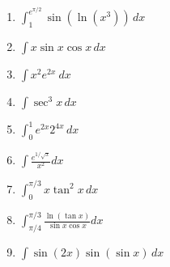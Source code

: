 \documentclass[letterpaper]{article}
\begin{document}
\begin{enumerate}
\begin{enumerate}
	\item $\int_1^{e^{\pi/2}} \sin (\ln (x^3))\,dx$

	\item $\int x \sin x \cos x\,dx$

	\item $\int x^2 e^{2x}~dx$

	\item $\int \sec^3 x\,dx$

	\item $\int_0^1 e^{2x}2^{4x}\,dx$

	\item $\int \frac{e^{1/\sqrt{x}}}{x^2}dx$

	\item $\int_0^{\pi/3} x\tan^2 x\,dx$

	\item $\int_{\pi/4}^{\pi/3} \frac{\ln(\tan x)}{\sin x \cos x}dx$

	\item $\int \sin(2x)\sin(\sin x)\,dx$
	\end{enumerate}


\end{enumerate}
\end{document}
